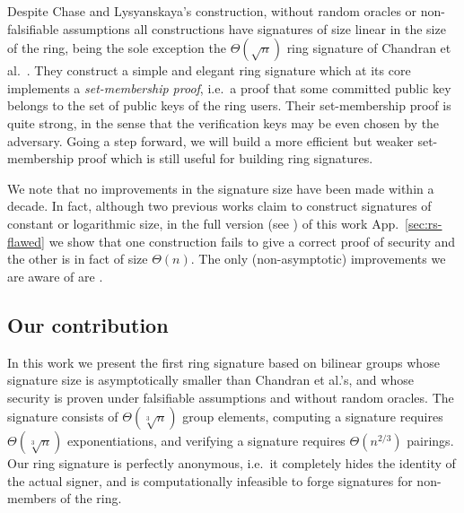 
Despite Chase and Lysyanskaya's construction, without random oracles or non-falsifiable assumptions all constructions have signatures of size linear in the size of the ring, being the sole exception the $\Theta(\sqrt{n})$ ring signature of Chandran et al.~\cite{ICALP:ChaGroSah07}. They construct a simple and elegant ring signature which at its core implements a \emph{set-membership proof}, i.e.~a proof that some committed public key belongs to the set of public keys of the ring users. Their set-membership proof is quite strong, in the sense that the verification keys may be even chosen by the adversary. Going a step forward, we will build a more efficient but weaker set-membership proof which is still useful for building ring signatures.

We note that no improvements in the
signature size have been made within a decade. In fact, although two previous works claim to construct signatures of constant \cite{ACISP:BosDasRan15} or logarithmic \cite{IET:GriSusPla16} size, in \ifPKC the full version (see \cite{EPRINT:Gon17}) of this work \else App.~\ref{sec:rs-flawed} \fi we show that one construction fails to give a correct proof of security and the other is in fact of size $\Theta(n)$. The only (non-asymptotic) improvements we are aware of are \cite{TCC:Rafols15,AC:GonHevRaf15}.

\subsection{Our contribution}
In this work we present the first ring signature based on bilinear groups whose signature size is asymptotically smaller than Chandran et al.'s, and whose security is proven under falsifiable assumptions and without random oracles. The signature consists of $\Theta(\sqrt[3]{n})$ group elements, computing a signature requires $\Theta(\sqrt[3]{n})$ exponentiations, and verifying a signature requires $\Theta(n^{2/3})$ pairings. Our ring signature is perfectly anonymous, i.e.~it completely hides the identity of the actual signer, and is computationally infeasible to forge signatures for non-members of the ring.

